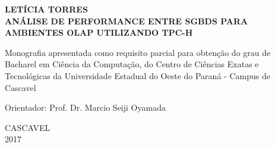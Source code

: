 

\fontsize{12}{12}
\begin{center}
\textbf{LETÍCIA TORRES}\\
\vspace{8cm}
\fontsize{14}{14}
\textbf{\MakeUppercase{Análise de Performance entre SGBDs para Ambientes OLAP Utilizando TPC-H}}\\
\vspace{2cm}
\end{center}
\fontsize{12}{12}

\begin{flushright}
\begin{minipage}[10cm] {8.5cm}
Monografia apresentada como requisito parcial para obtenção do grau de Bacharel em Ciência da Computação, do Centro de Ciências Exatas e Tecnológicas da Universidade Estadual do Oeste do Paraná - Campus de Cascavel

\vspace{1.5cm}
\noindent
Orientador: Prof. Dr. Marcio Seiji Oyamada
\end{minipage}
\end{flushright}
\vspace{5cm}
\begin{center}
CASCAVEL\\
2017
\end{center}



